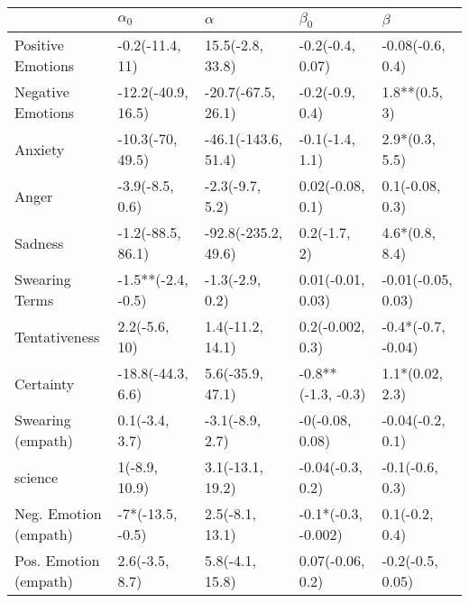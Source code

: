 \begin{tabular}{lllll}
\toprule
{} &          $\alpha_0$ &             $\alpha$ &            $\beta_0$ &             $\beta$ \\
\midrule
Positive Emotions     &     -0.2(-11.4, 11) &     15.5(-2.8, 33.8) &     -0.2(-0.4, 0.07) &    -0.08(-0.6, 0.4) \\
Negative Emotions     &  -12.2(-40.9, 16.5) &   -20.7(-67.5, 26.1) &      -0.2(-0.9, 0.4) &       1.8**(0.5, 3) \\
Anxiety               &    -10.3(-70, 49.5) &  -46.1(-143.6, 51.4) &      -0.1(-1.4, 1.1) &      2.9*(0.3, 5.5) \\
Anger                 &     -3.9(-8.5, 0.6) &      -2.3(-9.7, 5.2) &     0.02(-0.08, 0.1) &     0.1(-0.08, 0.3) \\
Sadness               &   -1.2(-88.5, 86.1) &  -92.8(-235.2, 49.6) &         0.2(-1.7, 2) &      4.6*(0.8, 8.4) \\
Swearing Terms        &  -1.5**(-2.4, -0.5) &      -1.3(-2.9, 0.2) &    0.01(-0.01, 0.03) &  -0.01(-0.05, 0.03) \\
Tentativeness         &       2.2(-5.6, 10) &     1.4(-11.2, 14.1) &     0.2(-0.002, 0.3) &  -0.4*(-0.7, -0.04) \\
Certainty             &   -18.8(-44.3, 6.6) &     5.6(-35.9, 47.1) &   -0.8**(-1.3, -0.3) &     1.1*(0.02, 2.3) \\
Swearing (empath)     &      0.1(-3.4, 3.7) &      -3.1(-8.9, 2.7) &      -0(-0.08, 0.08) &    -0.04(-0.2, 0.1) \\
science               &       1(-8.9, 10.9) &     3.1(-13.1, 19.2) &     -0.04(-0.3, 0.2) &     -0.1(-0.6, 0.3) \\
Neg. Emotion (empath) &    -7*(-13.5, -0.5) &      2.5(-8.1, 13.1) &  -0.1*(-0.3, -0.002) &      0.1(-0.2, 0.4) \\
Pos. Emotion (empath) &      2.6(-3.5, 8.7) &      5.8(-4.1, 15.8) &     0.07(-0.06, 0.2) &    -0.2(-0.5, 0.05) \\
\bottomrule
\end{tabular}
